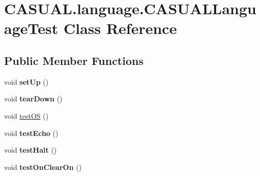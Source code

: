 \hypertarget{class_c_a_s_u_a_l_1_1language_1_1_c_a_s_u_a_l_language_test}{\section{C\-A\-S\-U\-A\-L.\-language.\-C\-A\-S\-U\-A\-L\-Language\-Test Class Reference}
\label{class_c_a_s_u_a_l_1_1language_1_1_c_a_s_u_a_l_language_test}
}
\subsection*{Public Member Functions}
\begin{DoxyCompactItemize}
\item 
\hypertarget{class_c_a_s_u_a_l_1_1language_1_1_c_a_s_u_a_l_language_test_aa14bc500d67fdddabc2082823b16d7d3}{void {\bfseries set\-Up} ()}\label{class_c_a_s_u_a_l_1_1language_1_1_c_a_s_u_a_l_language_test_aa14bc500d67fdddabc2082823b16d7d3}

\item 
\hypertarget{class_c_a_s_u_a_l_1_1language_1_1_c_a_s_u_a_l_language_test_a250ffa293ae6a0137faea18ab903e1ef}{void {\bfseries tear\-Down} ()}\label{class_c_a_s_u_a_l_1_1language_1_1_c_a_s_u_a_l_language_test_a250ffa293ae6a0137faea18ab903e1ef}

\item 
void \hyperlink{class_c_a_s_u_a_l_1_1language_1_1_c_a_s_u_a_l_language_test_a5ecda1753a64390840dcb18298e98cab}{test\-O\-S} ()
\item 
\hypertarget{class_c_a_s_u_a_l_1_1language_1_1_c_a_s_u_a_l_language_test_a9049a8d2c6befb74939ede0ef3607f7c}{void {\bfseries test\-Echo} ()}\label{class_c_a_s_u_a_l_1_1language_1_1_c_a_s_u_a_l_language_test_a9049a8d2c6befb74939ede0ef3607f7c}

\item 
\hypertarget{class_c_a_s_u_a_l_1_1language_1_1_c_a_s_u_a_l_language_test_ae51d5f622f50f64b96b66f89028c8065}{void {\bfseries test\-Halt} ()}\label{class_c_a_s_u_a_l_1_1language_1_1_c_a_s_u_a_l_language_test_ae51d5f622f50f64b96b66f89028c8065}

\item 
\hypertarget{class_c_a_s_u_a_l_1_1language_1_1_c_a_s_u_a_l_language_test_ac358ab4c2005003b40f4972383f9cf80}{void {\bfseries test\-On\-Clear\-On} ()}\label{class_c_a_s_u_a_l_1_1language_1_1_c_a_s_u_a_l_language_test_ac358ab4c2005003b40f4972383f9cf80}


\end{DoxyCompactItemize}
